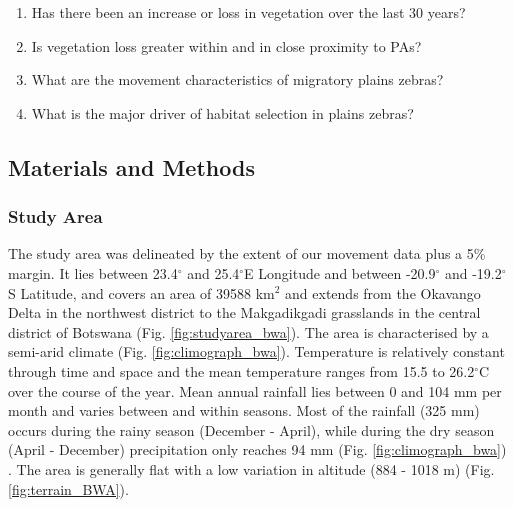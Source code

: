 \documentclass[12pt,a4paper, twoside, english]{article}
\begin{document}
\begin{enumerate}
  \item Has there been an increase or loss in vegetation over the last 30 years?
  \item Is vegetation loss greater within and in close proximity to PAs?
  \item What are the movement characteristics of migratory plains zebras?
  \item What is the major driver of habitat selection in plains zebras?
\end{enumerate}

\newpage
\subsection{Materials and Methods}

\subsubsection{Study Area}

The study area was delineated by the extent of our movement data plus a 5\% margin. It lies between 23.4$^{\circ}$ and 25.4$^{\circ}$E Longitude and between -20.9$^{\circ}$ and -19.2$^{\circ}$S Latitude, and covers an area of 39588 km$^{2}$ and extends from the Okavango Delta in the northwest district to the Makgadikgadi grasslands in the central district of Botswana (Fig. \ref{fig:studyarea_bwa}). The area is characterised by a semi-arid climate (Fig. \ref{fig:climograph_bwa}). Temperature is relatively constant through time and space and the mean temperature ranges from 15.5 to 26.2$^{\circ}$C over the course of the year. Mean annual rainfall lies between 0 and 104 mm per month and varies between and within seasons. Most of the rainfall (325 mm) occurs during the rainy season (December - April), while during the dry season (April - December) precipitation only reaches 94 mm (Fig. \ref{fig:climograph_bwa}) \citep{Hijmans2005}. The area is generally flat with a low variation in altitude (884 - 1018 m) (Fig. \ref{fig:terrain_BWA}).
\end{document}

